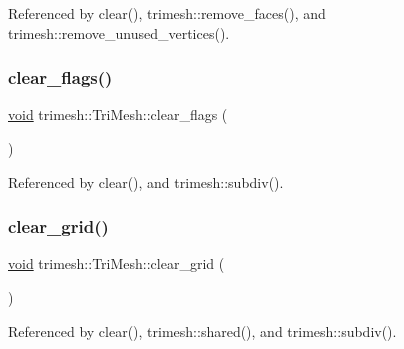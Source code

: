 Referenced by clear(), trimesh\+::remove\+\_\+faces(), and trimesh\+::remove\+\_\+unused\+\_\+vertices().

\mbox{\label{classtrimesh_1_1TriMesh_aac77247f08260fe70dd321f54ce86ec0}} 
\subsubsection{\texorpdfstring{clear\+\_\+flags()}{clear\_flags()}}
{\footnotesize\ttfamily \hyperlink{namespacetrimesh_a784ddfd979e1c579bda795a8edfc3f43}{void} trimesh\+::\+Tri\+Mesh\+::clear\+\_\+flags (\begin{DoxyParamCaption}{ }\end{DoxyParamCaption})\hspace{0.3cm}{\ttfamily [inline]}}



Referenced by clear(), and trimesh\+::subdiv().

\mbox{\label{classtrimesh_1_1TriMesh_a73f6c7beefc013d0761ebee2e6c6d030}} 
\subsubsection{\texorpdfstring{clear\+\_\+grid()}{clear\_grid()}}
{\footnotesize\ttfamily \hyperlink{namespacetrimesh_a784ddfd979e1c579bda795a8edfc3f43}{void} trimesh\+::\+Tri\+Mesh\+::clear\+\_\+grid (\begin{DoxyParamCaption}{ }\end{DoxyParamCaption})\hspace{0.3cm}{\ttfamily [inline]}}



Referenced by clear(), trimesh\+::shared(), and trimesh\+::subdiv().

\mbox{\label{classtrimesh_1_1TriMesh_ad37303de2ad5098a44831248a0bebc93}} 
